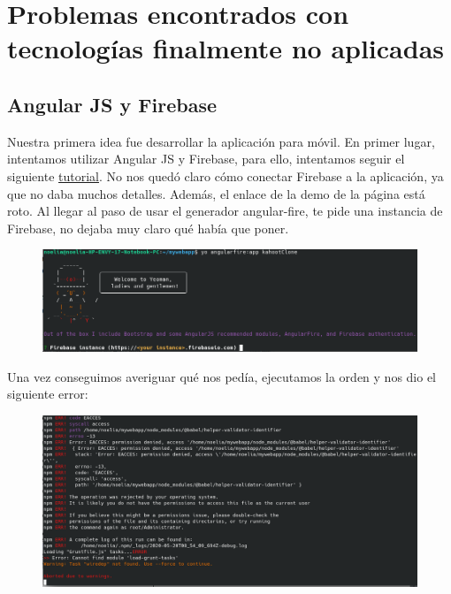\documentclass{article}
\begin{document}
	\section{Problemas encontrados con tecnologías finalmente no aplicadas}
	\subsection{Angular JS y Firebase}
	Nuestra primera idea fue desarrollar la aplicación para móvil. En primer lugar, intentamos utilizar Angular JS y Firebase, para ello, intentamos seguir el siguiente 
	 \href{https://medium.com/@rotemtam/build-a-kahoot-clone-with-angularjs-and-firebase-b8b30891d968}{tutorial}. No nos quedó claro cómo conectar Firebase a la aplicación, ya que no daba muchos detalles. Además, el enlace de la demo de la página está roto. Al llegar al paso de usar el generador angular-fire, te pide una instancia de Firebase, no dejaba muy claro qué había que poner.
	 
	 \begin{figure}[H]
	 	\centering
	 	\includegraphics[totalheight=3.35cm]{img/1.png}
	 \end{figure}
 
 	Una vez conseguimos averiguar qué nos pedía, ejecutamos la orden y nos dio el siguiente error:
 	
 	\begin{figure}[H]
 		\centering
 		\includegraphics[totalheight=5.5cm]{img/2.png}
 	\end{figure}
\end{document}
